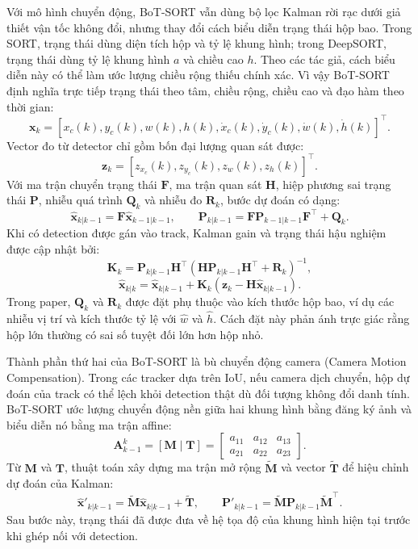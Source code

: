 \documentclass[../DoAn.tex]{subfiles}
\begin{document}
Với mô hình chuyển động, BoT-SORT vẫn dùng bộ lọc Kalman rời rạc dưới giả thiết vận tốc không đổi, nhưng thay đổi cách biểu diễn trạng thái hộp bao. Trong SORT, trạng thái dùng diện tích hộp và tỷ lệ khung hình; trong DeepSORT, trạng thái dùng tỷ lệ khung hình \(a\) và chiều cao \(h\). Theo các tác giả, cách biểu diễn này có thể làm ước lượng chiều rộng thiếu chính xác. Vì vậy BoT-SORT định nghĩa trực tiếp trạng thái theo tâm, chiều rộng, chiều cao và đạo hàm theo thời gian:
\[
\mathbf{x}_k =
[x_c(k), y_c(k), w(k), h(k),
\dot{x}_c(k), \dot{y}_c(k), \dot{w}(k), \dot{h}(k)]^\top .
\]
Vector đo từ detector chỉ gồm bốn đại lượng quan sát được:
\[
\mathbf{z}_k =
[z_{x_c}(k), z_{y_c}(k), z_w(k), z_h(k)]^\top .
\]
Với ma trận chuyển trạng thái \(\mathbf{F}\), ma trận quan sát \(\mathbf{H}\), hiệp phương sai trạng thái \(\mathbf{P}\), nhiễu quá trình \(\mathbf{Q}_k\) và nhiễu đo \(\mathbf{R}_k\), bước dự đoán có dạng:
\[
\hat{\mathbf{x}}_{k|k-1}=\mathbf{F}\hat{\mathbf{x}}_{k-1|k-1},
\qquad
\mathbf{P}_{k|k-1}=
\mathbf{F}\mathbf{P}_{k-1|k-1}\mathbf{F}^{\top}+\mathbf{Q}_k.
\]
Khi có detection được gán vào track, Kalman gain và trạng thái hậu nghiệm được cập nhật bởi:
\[
\mathbf{K}_k =
\mathbf{P}_{k|k-1}\mathbf{H}^{\top}
(\mathbf{H}\mathbf{P}_{k|k-1}\mathbf{H}^{\top}+\mathbf{R}_k)^{-1},
\]
\[
\hat{\mathbf{x}}_{k|k}=
\hat{\mathbf{x}}_{k|k-1}
+\mathbf{K}_k(\mathbf{z}_k-\mathbf{H}\hat{\mathbf{x}}_{k|k-1}).
\]
Trong paper, \(\mathbf{Q}_k\) và \(\mathbf{R}_k\) được đặt phụ thuộc vào kích thước hộp bao, ví dụ các nhiễu vị trí và kích thước tỷ lệ với \(\hat{w}\) và \(\hat{h}\). Cách đặt này phản ánh trực giác rằng hộp lớn thường có sai số tuyệt đối lớn hơn hộp nhỏ.

Thành phần thứ hai của BoT-SORT là bù chuyển động camera (Camera Motion Compensation). Trong các tracker dựa trên IoU, nếu camera dịch chuyển, hộp dự đoán của track có thể lệch khỏi detection thật dù đối tượng không đổi danh tính. BoT-SORT ước lượng chuyển động nền giữa hai khung hình bằng đăng ký ảnh và biểu diễn nó bằng ma trận affine:
\[
\mathbf{A}_{k-1}^{k} =
[\mathbf{M}\mid \mathbf{T}] =
\begin{bmatrix}
a_{11} & a_{12} & a_{13}\\
a_{21} & a_{22} & a_{23}
\end{bmatrix}.
\]
Từ \(\mathbf{M}\) và \(\mathbf{T}\), thuật toán xây dựng ma trận mở rộng \(\tilde{\mathbf{M}}\) và vector \(\tilde{\mathbf{T}}\) để hiệu chỉnh dự đoán của Kalman:
\[
\hat{\mathbf{x}}'_{k|k-1} =
\tilde{\mathbf{M}}\hat{\mathbf{x}}_{k|k-1}+\tilde{\mathbf{T}},
\qquad
\mathbf{P}'_{k|k-1} =
\tilde{\mathbf{M}}\mathbf{P}_{k|k-1}\tilde{\mathbf{M}}^{\top}.
\]
Sau bước này, trạng thái đã được đưa về hệ tọa độ của khung hình hiện tại trước khi ghép nối với detection.
\end{document}

